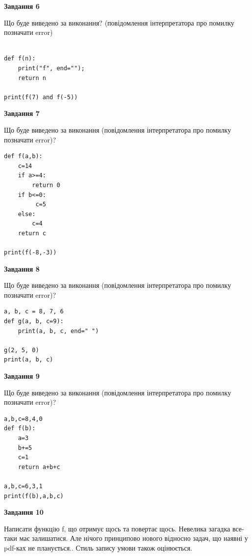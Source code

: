 \documentclass[12pt, ukrainian]{article}
\begin{document}
{\begin {large}
{\begin {center}\textbf{Завдання 6}\end {center}}

Що буде виведено за виконання? (повідомлення інтерпретатора про помилку позначати error)\par
\begin{verbatim}

def f(n):
    print("f", end="");
    return n

print(f(7) and f(-5))
\end{verbatim}

{\begin {center}\textbf{Завдання 7}\end {center}}

Що буде виведено за виконання (повідомлення інтерпретатора про помилку позначати error)?\par
\begin{verbatim}
def f(a,b):
    c=14
    if a>=4:
        return 0
    if b<=0:
         c=5
    else: 
        c=4
    return c

print(f(-8,-3))
\end{verbatim}

{\begin {center}\textbf{Завдання 8}\end {center}}

Що буде виведено за виконання (повідомлення інтерпретатора про помилку позначати error)?\par
\begin{verbatim}
a, b, c = 8, 7, 6
def g(a, b, c=9):
    print(a, b, c, end=" ")

g(2, 5, 0)
print(a, b, c)
\end{verbatim}

{\begin {center}\textbf{Завдання 9}\end {center}}

Що буде виведено за виконання (повідомлення інтерпретатора про помилку позначати error)?\par
\begin{verbatim}
a,b,c=8,4,0
def f(b):
    a=3
    b+=5
    c=1
    return a+b+c

a,b,c=6,3,1
print(f(b),a,b,c)
\end{verbatim}

{\begin {center}\textbf{Завдання 10}\end {center}}


Написати функцiю f, що отримує щось та повертає щось. Невелика загадка все-таки має залишатися. Але нічого принципово нового відносно задач, що наявні у pdf-ках не планується.. Стиль запису умови також оцінюється.\par
\end {large}}
\newpage
\end{document}
